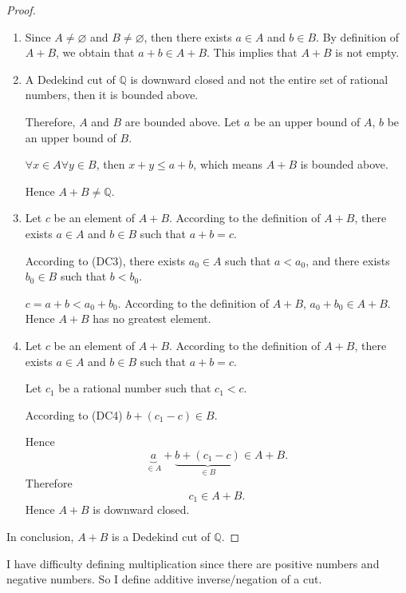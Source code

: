 \begin{proof}
    \begin{enumerate}[label = (\roman*)]
        \item Since $A\ne\varnothing$ and $B\ne\varnothing$, then there exists $a\in A$ and $b\in B$. By definition of $A + B$, we obtain that $a + b \in A + B$. This implies that $A + B$ is not empty.
        \item A Dedekind cut of $\mathbb{Q}$ is downward closed and not the entire set of rational numbers, then it is bounded above.

              Therefore, $A$ and $B$ are bounded above. Let $a$ be an upper bound of $A$, $b$ be an upper bound of $B$.

              $\forall x\in A\forall y\in B$, then $x + y \le a + b$, which means $A + B$ is bounded above.

              Hence $A + B\ne\mathbb{Q}$.
        \item Let $c$ be an element of $A + B$. According to the definition of $A + B$, there exists $a\in A$ and $b\in B$ such that $a + b = c$.

              According to (DC3), there exists $a_{0}\in A$ such that $a < a_{0}$, and there exists $b_{0}\in B$ such that $b < b_{0}$.

              $c = a + b < a_{0} + b_{0}$. According to the definition of $A + B$, $a_{0} + b_{0} \in A + B$. Hence $A + B$ has no greatest element.
        \item Let $c$ be an element of $A + B$. According to the definition of $A + B$, there exists $a\in A$ and $b\in B$ such that $a + b = c$.

              Let $c_{1}$ be a rational number such that $c_{1} < c$.

              According to (DC4) $b + (c_{1} - c)\in B$.

              Hence
              \[
                  \underbrace{a}_{\in A} + \underbrace{b + (c_{1} - c)}_{\in B} \in A + B.
              \]
              Therefore
              \[
                  c_{1} \in A + B.
              \]
              Hence $A + B$ is downward closed.
    \end{enumerate}
    In conclusion, $A + B$ is a Dedekind cut of $\mathbb{Q}$.
\end{proof}

I have difficulty defining multiplication since there are positive numbers and negative numbers. So I define additive inverse/negation of a cut.

